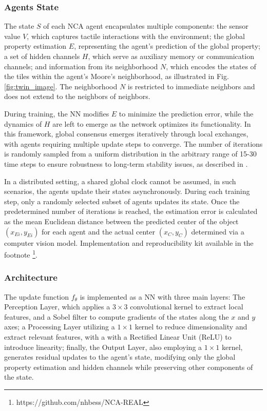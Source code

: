 \subsubsection{Agents State}
The state $S$ of each \ac{NCA} agent encapsulates multiple components: the sensor value $V$, which captures tactile interactions with the environment; the global property estimation $E$, representing the agent's prediction of the global property; a set of hidden channels $H$, which serve as auxiliary memory or communication channels; and information from its neighborhood $N$, which encodes the states of the tiles within the agent's Moore's neighborhood, as illustrated in Fig. \ref{fig:twin_image}. 
The neighborhood $N$ is restricted to immediate neighbors and does not extend to the neighbors of neighbors. 

During training, the \ac{NN} modifies $E$ to minimize the prediction error, while the dynamics of $H$ are left to emerge as the network optimizes its functionality. In this framework, global consensus emerges iteratively through local exchanges, with agents requiring multiple update steps to converge. The number of iterations is randomly sampled from a uniform distribution in the arbitrary range of 15-30 time steps to ensure robustness to long-term stability issues, as described in \cite{wolfram_universality_nodate}.

In a distributed setting, a shared global clock cannot be assumed, in such scenarios, the agents update their states asynchronously. During each training step, only a randomly selected subset of agents updates its state. Once the predetermined number of iterations is reached, the estimation error is calculated as the mean Euclidean distance between the predicted center of the object $(x_{Ei}, y_{Ei})$ for each agent and the actual center $(x_C, y_C)$ determined via a computer vision model. Implementation and reproducibility kit available in the footnote \footnote{https://github.com/nhbess/NCA-REAL}. %

\subsubsection{Architecture}

The update function $f_\theta$ is implemented as a \ac{NN} with three main layers: The Perception Layer, which applies a $3 \times 3$ convolutional kernel to extract local features, and a Sobel filter to compute gradients of the states along the $x$ and $y$ axes; a Processing Layer utilizing a $1 \times 1$ kernel to reduce dimensionality and extract relevant features, with a with a Rectified Linear Unit (ReLU) to introduce linearity; finally, the Output Layer, also employing a $1 \times 1$ kernel, generates residual updates to the agent's state, modifying only the global property estimation and hidden channels while preserving other components of the state.


